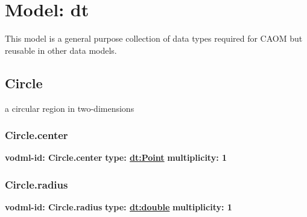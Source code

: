 
%



    
    

\pagebreak
\section{Model: dt }
  

  This model is a general purpose collection of data types required for CAOM but reusable in other data models.

  \subsection{Circle}
  \label{sect:Circle}
    a circular region in two-dimensions

    \subsubsection{Circle.center}
      \textbf{vodml-id: Circle.center} \newline
      \textbf{type: \hyperref[sect:Point]{dt:Point}} \newline
      \textbf{multiplicity: 1} 

    \subsubsection{Circle.radius}
      \textbf{vodml-id: Circle.radius} \newline
      \textbf{type: \hyperref[sect:double]{dt:double}} \newline
      \textbf{multiplicity: 1} 

